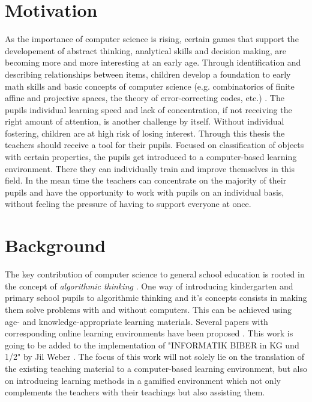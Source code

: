 \documentclass[a4paper,oneside,11pt,final]{scrartcl}
\begin{document}
\newpage

\section*{Motivation}
As the importance of computer science is rising, certain games that support the
developement of abstract thinking, analytical skills and decision making, are
becoming more and more interesting at an early age. Through identification and
describing relationships between items, children develop a foundation to early
math skills and basic concepts of computer science (e.g. combinatorics of finite
affine and projective spaces, the theory of error-correcting codes, etc.)
\cite{SET}. The pupils individual learning speed and lack of concentration, if
not receiving the right amount of attention, is another challenge by itself.
Without individual fostering, children are at high risk of losing interest.
Through this thesis the teachers should receive a tool for their pupils. Focused
on classification of objects with certain properties, the pupils get introduced
to a computer-based learning environment. There they can individually train and
improve themselves in this field. In the mean time the teachers can concentrate
on the majority of their pupils and have the opportunity to work with pupils on
an individual basis, without feeling the pressure of having to support everyone
at once.

\section*{Background}
The key contribution of computer science to general school education is rooted
in the concept of \textit{algorithmic thinking} \cite{HKKS17}. One way of
introducing kindergarten and primary school pupils to algorithmic thinking and
it's concepts consists in making them solve problems with and without computers.
This can be achieved using age- and knowledge-appropriate learning materials.
Several papers with corresponding online learning environments have been
proposed \cite{STBLUM, SKAMP, TANGK, JWEBER}. This work is going to be added to
the implementation of "INFORMATIK BIBER in KG und 1/2" by Jil Weber
\cite{JWEBER}. The focus of this work will not solely lie on the translation of
the existing teaching material to a computer-based learning environment, but
also on introducing learning methods in a gamified environment which not only
complements the teachers with their teachings but also assisting them. 
\end{document}
